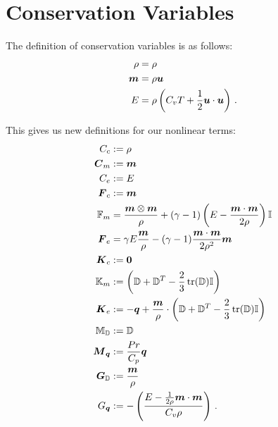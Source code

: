 \documentclass[Dissertation.tex]{subfiles}
\begin{document}
\section{Conservation Variables}
The definition of conservation variables is as follows: 
\begin{align*}
\rho&=\rho\\
\boldsymbol m&=\rho\boldsymbol u\\
E&=\rho\left( C_v T+\frac{1}{2}\boldsymbol u\cdot\boldsymbol u \right)\,.
\end{align*}

This gives us new definitions for our nonlinear terms:
\begin{align*}
C_c&:=\rho\\
\boldsymbol C_m&:=\boldsymbol m\\
C_e&:=E\\
\boldsymbol F_c&:=\boldsymbol m\\
\mathbb{F}_m&=\frac{\boldsymbol m\otimes\boldsymbol m}{\rho}+(\gamma-1)\left( E-\frac{\boldsymbol m\cdot\boldsymbol m}{2\rho} \right)\mathbb{I}\\
\boldsymbol F_e&=\gamma E\frac{\boldsymbol m}{\rho}-(\gamma-1)\frac{\boldsymbol m\cdot\boldsymbol m}{2\rho^2}\boldsymbol m\\
\boldsymbol K_c&:=\boldsymbol 0\\
\mathbb{K}_m&:=\left( \mathbb{D}+\mathbb{D}^T-\frac{2}{3}\operatorname*{tr}(\mathbb{D})\mathbb{I} \right)\\
\boldsymbol K_e&:=-\boldsymbol q+\frac{\boldsymbol m}{\rho}\cdot\left( \mathbb{D}+\mathbb{D}^T-\frac{2}{3}\operatorname*{tr}(\mathbb{D})\mathbb{I} \right)\\
\mathbb{M}_{\mathbb{D}}&:=\mathbb{D}\\
\boldsymbol M_{\boldsymbol q}&:=\frac{Pr}{C_p}\boldsymbol q\\
\boldsymbol G_{\mathbb{D}}&:=\frac{\boldsymbol m}{\rho}\\
G_{\boldsymbol q}&:=-\left( \frac{E-\frac{1}{2\rho}\boldsymbol m\cdot\boldsymbol m}{C_v\rho} \right)\,.
\end{align*}
\end{document}
